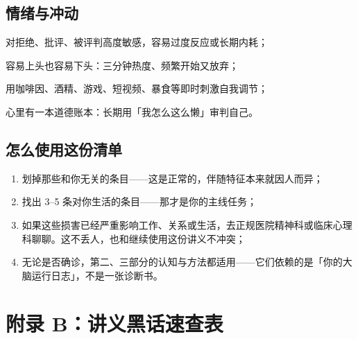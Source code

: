 \subsection*{情绪与冲动}

\begin{checklist}
  \item 对拒绝、批评、被评判高度敏感，容易过度反应或长期内耗；
  \item 容易上头也容易下头：三分钟热度、频繁开始又放弃；
  \item 用咖啡因、酒精、游戏、短视频、暴食等即时刺激自我调节；
  \item 心里有一本道德账本：长期用「我怎么这么懒」审判自己。
\end{checklist}

\subsection*{怎么使用这份清单}

\begin{enumerate}[leftmargin=2em,itemsep=2pt]
  \item 划掉那些和你无关的条目——这是正常的，伴随特征本来就因人而异；
  \item 找出 3--5 条对你生活的条目——那才是你的主线任务；
  \item 如果这些损害已经严重影响工作、关系或生活，去正规医院精神科或临床心理科聊聊。这不丢人，也和继续使用这份讲义不冲突；
  \item 无论是否确诊，第二、三部分的认知与方法都适用——它们依赖的是「你的大脑运行日志」，不是一张诊断书。
\end{enumerate}

\section*{附录 B：讲义黑话速查表}

